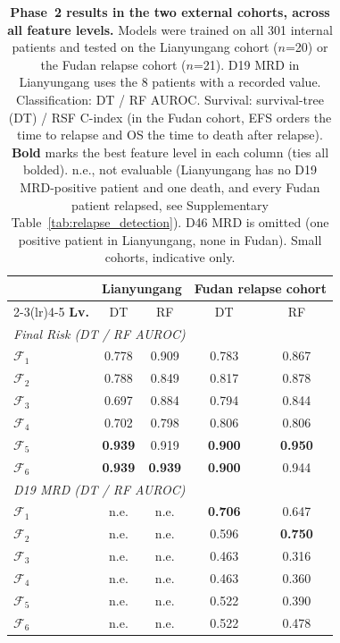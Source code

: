 \documentclass[pdflatex,sn-nature]{sn-jnl}
\begin{document}
\begin{appendices}
\begin{table}[p]
\caption{\textbf{Phase~2 results in the two external cohorts, across
all feature levels.} Models were trained on all 301 internal patients
and tested on the Lianyungang cohort ($n$=20) or the Fudan relapse
cohort ($n$=21). D19 MRD in Lianyungang uses the 8 patients with a
recorded value.
Classification: DT / RF AUROC. Survival: survival-tree (DT) / RSF
C-index (in the Fudan cohort, EFS orders the time to relapse and OS the
time to death after relapse). \textbf{Bold} marks the best feature
level in each column (ties all bolded). n.e., not evaluable
(Lianyungang has no D19 MRD-positive patient and one death, and every
Fudan patient relapsed, see Supplementary
Table~\ref{tab:relapse_detection}). D46 MRD is omitted (one positive
patient in Lianyungang, none in Fudan). Small cohorts, indicative
only.}
\label{tab:phase2_ext}
\centering
\footnotesize
\renewcommand{\arraystretch}{0.84}
\setlength{\tabcolsep}{5pt}
\begin{tabular}{@{}l cc cc@{}}
\toprule
 & \multicolumn{2}{c}{\textbf{Lianyungang}} & \multicolumn{2}{c}{\textbf{Fudan relapse cohort}} \\
\cmidrule(lr){2-3}\cmidrule(lr){4-5}
\textbf{Lv.} & DT & RF & DT & RF \\
\midrule
\multicolumn{5}{l}{\textit{Final Risk (DT / RF AUROC)}} \\
$\mathcal{F}_1$ & 0.778 & 0.909 & 0.783 & 0.867 \\
$\mathcal{F}_2$ & 0.788 & 0.849 & 0.817 & 0.878 \\
$\mathcal{F}_3$ & 0.697 & 0.884 & 0.794 & 0.844 \\
$\mathcal{F}_4$ & 0.702 & 0.798 & 0.806 & 0.806 \\
$\mathcal{F}_5$ & \textbf{0.939} & 0.919 & \textbf{0.900} & \textbf{0.950} \\
$\mathcal{F}_6$ & \textbf{0.939} & \textbf{0.939} & \textbf{0.900} & 0.944 \\
\multicolumn{5}{l}{\textit{D19 MRD (DT / RF AUROC)}} \\
$\mathcal{F}_1$ & n.e. & n.e. & \textbf{0.706} & 0.647 \\
$\mathcal{F}_2$ & n.e. & n.e. & 0.596 & \textbf{0.750} \\
$\mathcal{F}_3$ & n.e. & n.e. & 0.463 & 0.316 \\
$\mathcal{F}_4$ & n.e. & n.e. & 0.463 & 0.360 \\
$\mathcal{F}_5$ & n.e. & n.e. & 0.522 & 0.390 \\
$\mathcal{F}_6$ & n.e. & n.e. & 0.522 & 0.478 \\

\end{tabular}
\end{table}
\end{appendices}
\end{document}
